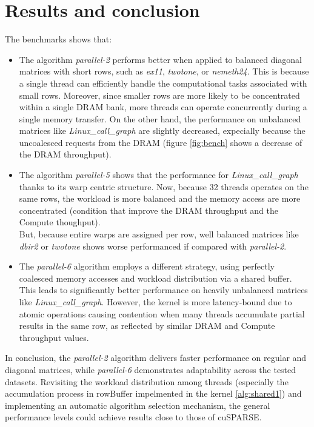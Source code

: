 \documentclass[conference]{IEEEtran}
\begin{document}
\section{Results and conclusion}
The benchmarks shows that:
\begin{itemize}
    \item The algorithm {\it{parallel-2}} performs better when applied to balanced diagonal matrices with short rows, such as {\it{ex11}}\cite{ex11}, {\it{twotone}}\cite{twotone}, or {\it{nemeth24}}\cite{nemeth24}.
        This is because a single thread can efficiently handle the computational tasks associated with small rows. Moreover, since smaller rows are more likely to be concentrated within a single DRAM bank, more threads can operate concurrently during a single memory transfer. 
        On the other hand, the performance on unbalanced matrices like {\it{Linux\_call\_graph}}\cite{linuxcallgraph} are slightly decreased, expecially because the uncoalesced requests from the DRAM (figure \ref{fig:bench} shows a decrease of the DRAM throughput). 
    \item The algorithm {\it{parallel-5}} shows that the performance for {\it{Linux\_call\_graph}}\cite{linuxcallgraph} thanks to its warp centric structure. Now, because 32 threads operates on the same rows, the workload is more balanced and the memory access are more concentrated (condition that improve the DRAM throughput and the Compute thoughput).
        \\
        But, because entire warps are assigned per row, well balanced matrices like {\it{dbir2}}\cite{dbir2} or {\it{twotone}}\cite{twotone} shows worse performanced if compared with {\it{parallel-2}}.
    \item The {\it{parallel-6}} algorithm employs a different strategy, using perfectly coalesced memory accesses and workload distribution via a shared buffer. This leads to significantly better performance on heavily unbalanced matrices like {\it{Linux\_call\_graph}}\cite{linuxcallgraph}. However, the kernel is more latency-bound due to atomic operations causing contention when many threads accumulate partial results in the same row, as reflected by similar DRAM and Compute throughput values.
\end{itemize}
In conclusion, the {\it{parallel-2}} algorithm delivers faster performance on regular and diagonal matrices, while {\it{parallel-6}} demonstrates adaptability across the tested datasets. Revisiting the workload distribution among threads (especially the accumulation process in rowBuffer impelmented in the kernel \ref{alg:shared1}) and implementing an automatic algorithm selection mechanism, 
the general performance levels could achieve results close to those of cuSPARSE\cite{cuSPARSE}.



\end{document}

